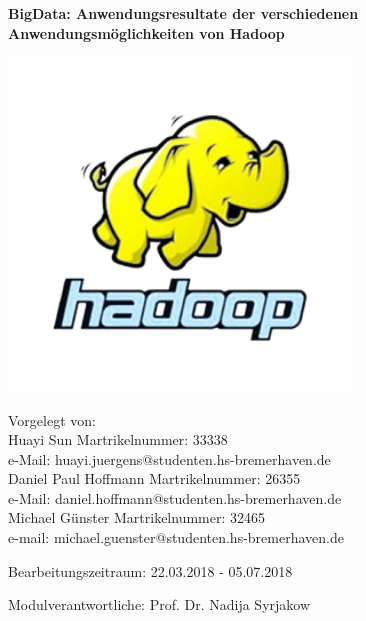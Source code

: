 \documentclass[12pt,ngerman,twoside]{scrartcl}
\begin{document}


\pagestyle{empty}

\begin{titlepage}
\centering
\begin{figure}[htbp]
\hspace*{3.3cm}
\end{figure}
        {\LARGE\bfseries BigData: Anwendungsresultate der verschiedenen Anwendungsmöglichkeiten von Hadoop \par}
\includegraphics[width=0.68\textwidth]{pics/hadoop.png}\par%
\vspace{0.1cm}
        Vorgelegt von: \\
        Huayi Sun 
        Martrikelnummer: 33338 \\ 
	e-Mail: huayi.juergens@studenten.hs-bremerhaven.de \\
        Daniel Paul Hoffmann 
        Martrikelnummer: 26355 \\
	e-Mail: daniel.hoffmann@studenten.hs-bremerhaven.de \\
        Michael Günster 
        Martrikelnummer: 32465 \\
	e-mail: michael.guenster@studenten.hs-bremerhaven.de \par

        Bearbeitungszeitraum: 22.03.2018 - 05.07.2018

\vspace*{\fill}
{\small
        Modulverantwortliche: Prof. Dr. Nadija Syrjakow\par}
\end{titlepage}
\end{document}
